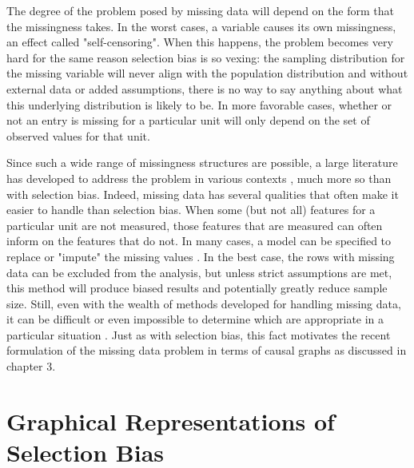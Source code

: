 \documentclass[12pt,twoside]{reedthesis}
\theoremstyle{definition}
\begin{document}
The degree of the problem posed by missing data will depend on the form that the missingness takes. In the worst cases, a variable causes its own missingness, an effect called "self-censoring". When this happens, the problem becomes very hard for the same reason selection bias is so vexing: the sampling distribution for the missing variable will never align with the population distribution and without external data or added assumptions, there is no way to say anything about what this underlying distribution is likely to be. In more favorable cases, whether or not an entry is missing for a particular unit will only depend on the set of observed values for that unit.

Since such a wide range of missingness structures are possible, a large  literature has developed to address the problem in various contexts \citep{Schafer_2002} \citep{Heckman_1979} \citep{Little_1986}, much more so than with selection bias. Indeed, missing data has several qualities that often make it easier to handle than selection bias.  When some (but not all) features for a particular unit are not measured, those features that are measured can often inform on the features that do not. In many cases, a model can be specified to replace or "impute" the missing values \citep{Donders_2006}. In the best case, the rows with missing data can be excluded from the analysis, but unless strict assumptions are met, this method will produce biased results and potentially greatly reduce sample size. Still, even with the wealth of methods developed for handling missing data, it can be difficult or even impossible to determine which are appropriate in a particular situation \citep{Mohan_2019}. Just as with selection bias, this fact motivates the recent formulation of the missing data problem in terms of causal graphs as discussed in chapter 3.



\chapter{Graphical Representations of Selection Bias}
\end{document}
